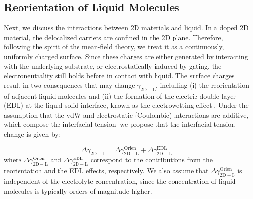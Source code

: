 \subsection{Reorientation of Liquid Molecules}
\label{sec:orgc4a9a93}

Next, we discuss the interactions between 2D materials and liquid. In
a doped 2D material, the delocalized carriers are confined in the 2D
plane. Therefore, following the spirit of the mean-field theory, we
treat it as a continuously, uniformly charged surface. Since these
charges are either generated by interacting with the underlying
substrate, or electrostatically induced by gating, the
electroneutrality still holds before in contact with liquid. The
surface charges result in two consequences that may change
\(\gamma_{\mathrm{2D-L}}\), including (i) the reorientation of adjacent
liquid molecules \cite{ostrowski_tunable_2014} and (ii) the formation of
the electric double layer (EDL) at the liquid-solid interface, known
as the electrowetting effect
\cite{Lippmann_1908,mugele_electrowetting:_2005}. Under the assumption
that the vdW and electrostatic (Coulombic) interactions are additive,
which compose the interfacial tension, we propose that the
interfacial tension change is given by:

\begin{equation}
\label{eqn-delta-gamma-decompose}
\Delta \gamma_{\mathrm{2D-L}} = \Delta \gamma_{\mathrm{2D-L}}^{\mathrm{Orien}}
                              + \Delta \gamma_{\mathrm{2D-L}}^{\mathrm{EDL}}
\end{equation}
where \(\Delta \gamma_{\mathrm{2D-L}}^{\mathrm{Orien}}\) and \(\Delta
\gamma_{\mathrm{2D-L}}^{\mathrm{EDL}}\) correspond to the contributions
from the reorientation and the EDL effects, respectively. We also
assume that \(\Delta \gamma_{\mathrm{2D-L}}^{\mathrm{Orien}}\) is independent of
the electrolyte concentration, since the concentration of liquid
molecules is typically orders-of-magnitude higher.


